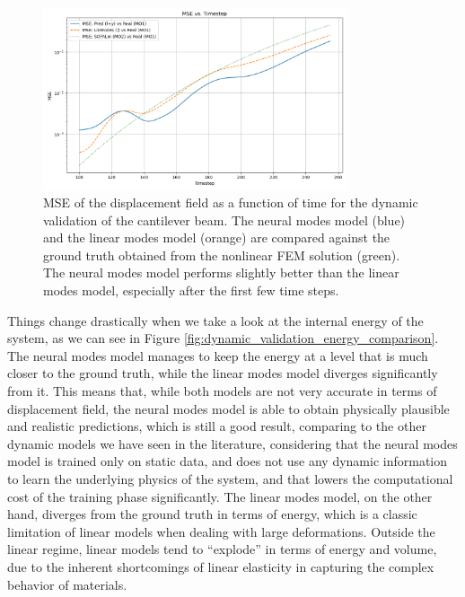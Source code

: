 \begin{figure}[H]
    \centering
    \includegraphics[width=0.8\textwidth]{Images/beam_dynamic_mse.png}
    \caption{MSE of the displacement field as a function of time for the dynamic validation of the cantilever beam. The neural modes model (blue) and the linear modes model (orange) are compared against the ground truth obtained from the nonlinear FEM solution (green). The neural modes model performs slightly better than the linear modes model, especially after the first few time steps.}
    \label{fig:dynamic_validation_mse_comparison}
    \end{figure}

Things change drastically when we take a look at the internal energy of the system, as we can see in Figure \ref{fig:dynamic_validation_energy_comparison}. The neural modes model manages to keep the energy at a level that is much closer to the ground truth, while the linear modes model diverges significantly from it. This means that, while both models are not very accurate in terms of displacement field, the neural modes model is able to obtain physically plausible and realistic predictions, which is still a good result, comparing to the other dynamic models we have seen in the literature, considering that the neural modes model is trained only on static data, and does not use any dynamic information to learn the underlying physics of the system, and that lowers the computational cost of the training phase significantly. The linear modes model, on the other hand, diverges from the ground truth in terms of energy, which is a classic limitation of linear models when dealing with large deformations. Outside the linear regime, linear models tend to ``explode'' in terms of energy and volume, due to the inherent shortcomings of linear elasticity in capturing the complex behavior of materials.

